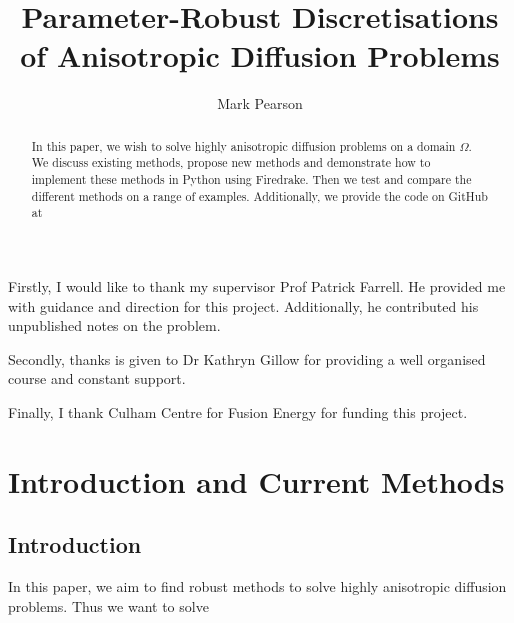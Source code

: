 \documentclass[12pt]{ociamthesis}
\title{Parameter-Robust Discretisations of Anisotropic 
Diffusion Problems}
\author{Mark Pearson}
\begin{document}
\maketitle

\thispagestyle{empty}

\newpage

\begin{acknowledgements} 

Firstly, I would like to thank my supervisor Prof Patrick Farrell. He provided me with guidance and direction for this project. Additionally, he contributed his unpublished notes on the problem.

Secondly, thanks is given to Dr Kathryn Gillow for providing a well organised course and constant support.

Finally, I thank Culham Centre for Fusion Energy for funding this project. 

\end{acknowledgements}

\newpage

\begin{abstract}
In this paper, we wish to solve highly anisotropic diffusion problems on a domain $\Omega$. We discuss existing methods, propose new methods and demonstrate how to implement these methods in Python using Firedrake. Then we test and compare the different methods on a range of examples. Additionally, we provide the code on GitHub at \cite{Hub}
\end{abstract}

\newpage
\setcounter{page}{1}

\tableofcontents


\chapter{Introduction and Current Methods}
\section{Introduction}
In this paper, we aim to find robust methods to solve highly anisotropic diffusion problems. Thus we want to solve
\end{document}
